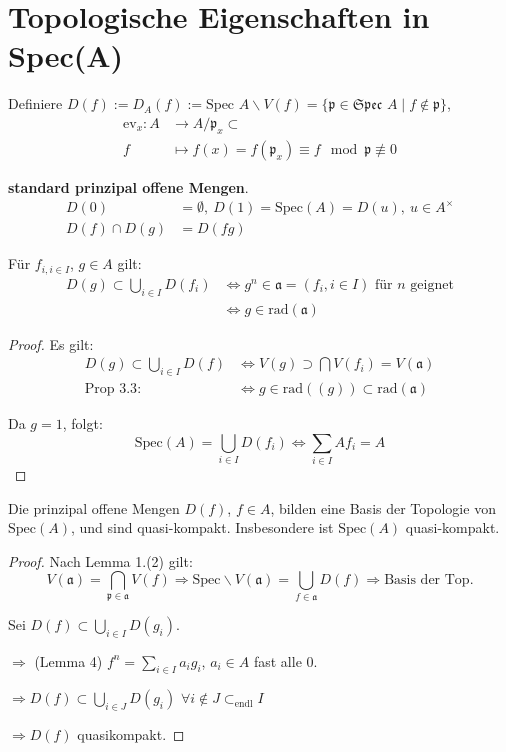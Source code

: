 \section{Topologische Eigenschaften in Spec(A)}

Definiere $D(f):=D_{A}(f):=\text{Spec }A\backslash
V(f)=\{\mathfrak{p\in\text{Spec }}A\mid f\notin\mathfrak{p}\}$,
\begin{align*}
  \text{ev}_{x}:A & \longrightarrow A/\mathfrak{p}_{x}\subset\\
  f & \longmapsto f(x)=f(\mathfrak{p}_{x})\equiv f\mod\mathfrak{p}\not\equiv0
\end{align*}

\textbf{standard prinzipal offene Mengen}.
\begin{align*}
  D(0) & =\emptyset,\ D(1)=\text{Spec}(A)=D(u),\ u\in A^{\times}\\
  D(f)\cap D(g) & =D(fg)
\end{align*}

\begin{lem}[4] Für $f_{i,i\in I}$, $g\in A$ gilt:
  \begin{align*}
    D(g)\subset\bigcup_{i\in I}D(f_{i})
    & \Leftrightarrow g^{n}\in\mathfrak{a}=(f_{i},i\in I)\text{ für }n\text{ geignet}\\
    & \Leftrightarrow g\in\text{rad}(\mathfrak{a})
  \end{align*}
\end{lem}
\begin{proof} Es gilt:
  \begin{align*}
    D(g)\subset\bigcup_{i\in I}D(f)
    & \Leftrightarrow V(g)\supset\bigcap V(f_{i})=V(\mathfrak{a})\\
    \text{Prop 3.3}:\ & \Leftrightarrow g\in\text{rad}((g))\subset\text{rad}(\mathfrak{a})
  \end{align*}

  Da $g=1$, folgt:
  \[ \text{Spec}(A)=\bigcup_{i\in I}D(f_{i})\Leftrightarrow\sum_{i\in
      I}Af_{i}=A
  \]
\end{proof}
\begin{prop}[5] Die prinzipal offene Mengen $D(f)$, $f\in A$, bilden
  eine Basis der Topologie von $\text{Spec}(A)$, und sind
  quasi-kompakt. Insbesondere ist $\text{Spec}(A)$ quasi-kompakt.
\end{prop}
\begin{proof} Nach Lemma 1.(2) gilt:
  \[
    V(\mathfrak{a})=\bigcap_{\mathfrak{p}\in\mathfrak{a}}V(f)\Rightarrow\text{Spec}\backslash
    V(\mathfrak{a})=\bigcup_{f\in\mathfrak{a}}D(f)\Rightarrow\text{Basis
      der Top.}
  \]

  Sei $D(f)\subset\bigcup_{i\in I}D(g_{i})$.

  $\Rightarrow$ (Lemma 4) $f^{n}=\sum_{i\in I}a_{i}g_{i}$, $a_{i}\in A$
  fast alle 0.

  $\Rightarrow D(f)\subset\bigcup_{i\in J}D(g_{i})$ $\forall i\notin
  J\subset_{\text{endl}}I$

  $\Rightarrow D(f)$ quasikompakt.
\end{proof}
